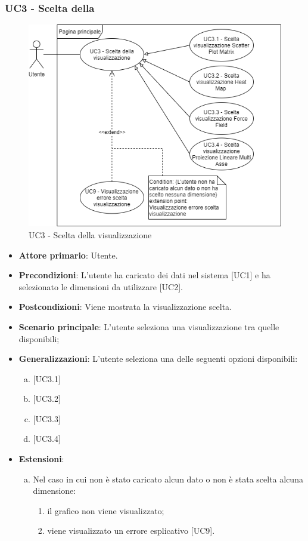 \newpage
\subsubsection{UC3 - Scelta della }
\begin{figure}[h]
\includegraphics[width=\linewidth]{section/Images/UC3.png}
\centering
\caption{UC3 - Scelta della visualizzazione}
\end{figure}
\begin{itemize}
	\item \textbf{Attore primario}: Utente.
	\item \textbf{Precondizioni}: L'utente ha caricato dei dati nel sistema [UC1] e ha selezionato le dimensioni da utilizzare [UC2].
	\item \textbf{Postcondizioni}: Viene mostrata la visualizzazione scelta.
	\item \textbf{Scenario principale}: L'utente seleziona una visualizzazione tra quelle disponibili;
	\item \textbf{Generalizzazioni}: L'utente seleziona una delle seguenti opzioni disponibili:
		\begin{enumerate}[(a)]
			\item {}
			\item {}
			\item {}
			\item {}
		\end{enumerate}
	\item \textbf{Estensioni}:
	\begin{enumerate}[(a)]
		\item Nel caso in cui non è stato caricato alcun dato o non è stata scelta alcuna dimensione:
		\begin{enumerate}[1.]
			\item il grafico non viene visualizzato;
			\item viene visualizzato un errore esplicativo [UC9].
		\end{enumerate}
	\end{enumerate}
\end{itemize}